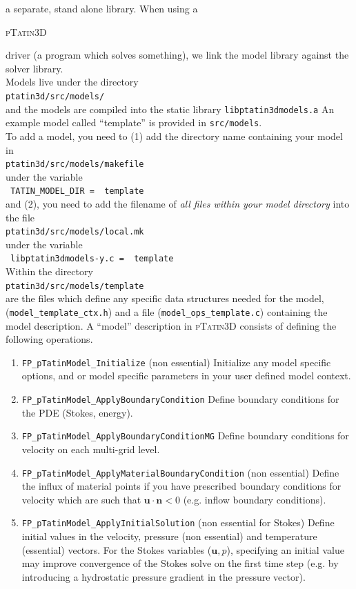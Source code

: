 \documentclass[paper=a4, fontsize=11pt,twoside]{scrartcl}
\newcommand{\ptat}{{{\textsc{pTatin3D}}}}
\newcommand{\shellcmd}[1]{\\\indent\indent\texttt{\hspace{5mm}\footnotesize #1}\\}
\newcommand{\unix}[1]{\texttt{\footnotesize #1}}
\begin{document}
a separate, stand alone library. When using a {\ptat{ driver (a program which solves something),
we link the model library against the solver library.
\\[8pt]
Models live under the directory
	\shellcmd{ptatin3d/src/models/}
and the models are compiled into the static library \unix{libptatin3dmodels.a}
An example model called ``template'' is provided in \unix{src/models}.
\\[8pt]
To add a model, you need to (1) add the directory name containing your model in
	\shellcmd{ptatin3d/src/models/makefile}
under the variable
	\shellcmd{
	TATIN\_MODEL\_DIR = \
        template
	}
and (2), you need to add the filename of \textit{all files within your model directory} into the file
	\shellcmd{ptatin3d/src/models/local.mk}
under the variable
	\shellcmd{
	libptatin3dmodels-y.c = \
        template
	}
Within the directory
	\shellcmd{ptatin3d/src/models/template}
are the files which define any specific data structures needed for the model,
	(\unix{model\_template\_ctx.h})
and a file (\unix{model\_ops\_template.c}) containing the model description.
A ``model'' description in {\ptat} consists of defining the following operations.
\begin{enumerate}
	\item \unix{FP\_pTatinModel\_Initialize} (non essential)
	Initialize any model specific options, and or model specific parameters in your user defined model context.

	\item \unix{FP\_pTatinModel\_ApplyBoundaryCondition}
	Define boundary conditions for the PDE (Stokes, energy).

	\item \unix{FP\_pTatinModel\_ApplyBoundaryConditionMG}
	Define boundary conditions for velocity on each multi-grid level.

	\item \unix{FP\_pTatinModel\_ApplyMaterialBoundaryCondition} (non essential)
	Define the influx of material points if you have prescribed boundary conditions for velocity which are such that $\boldsymbol u \cdot \boldsymbol n < 0$ (e.g. inflow boundary conditions).

	\item \unix{FP\_pTatinModel\_ApplyInitialSolution} (non essential for Stokes)
	Define initial values in the velocity, pressure (non essential) and temperature (essential) vectors. For the Stokes variables ($\boldsymbol u,p$), specifying an initial value may improve convergence of the Stokes solve on the first time step (e.g. by introducing a hydrostatic pressure gradient in the pressure vector).
	

\end{enumerate}}}
\end{document}
